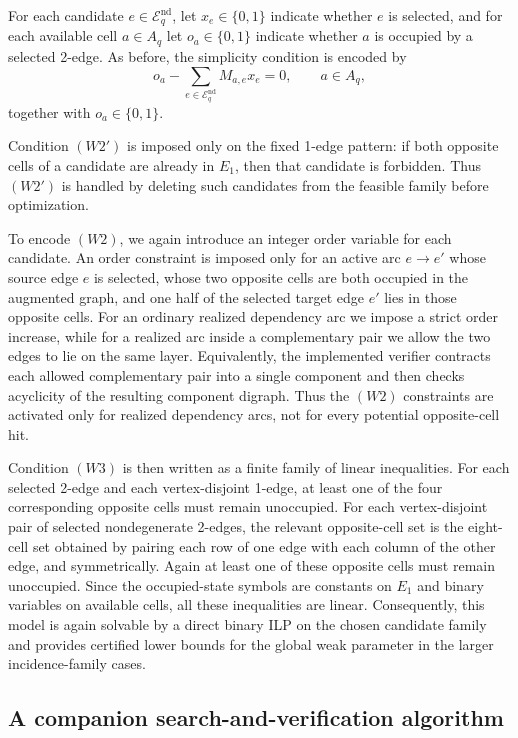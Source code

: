 \documentclass[10pt]{article}
\newcommand{\blue}[1]{#1}
\newcommand{\0}{\mathbf{0}}
\newcommand{\1}{\mathbf{1}}
\begin{document}
\blue{For each candidate \(e\in \mathcal E_q^{\mathrm{nd}}\), let \(x_e\in\{0,1\}\) indicate whether \(e\) is selected, and for each available cell \(a\in A_q\) let \(o_a\in\{0,1\}\) indicate whether \(a\) is occupied by a selected 2-edge. As before, the simplicity condition is encoded by}
\[
o_a-\sum_{e\in\mathcal E_q^{\mathrm{nd}}} M_{a,e}x_e=0,
\qquad a\in A_q,
\]
\blue{together with \(o_a\in\{0,1\}\).}

\blue{Condition \((W2')\) is imposed only on the fixed 1-edge pattern: if both opposite cells of a candidate are already in \(E_1\), then that candidate is forbidden. Thus \((W2')\) is handled by deleting such candidates from the feasible family before optimization.}

\blue{To encode \((W2)\), we again introduce an integer order variable for each candidate. An order constraint is imposed only for an active arc \(e\to e'\) whose source edge \(e\) is selected, whose two opposite cells are both occupied in the augmented graph, and one half of the selected target edge \(e'\) lies in those opposite cells. For an ordinary realized dependency arc we impose a strict order increase, while for a realized arc inside a complementary pair we allow the two edges to lie on the same layer. Equivalently, the implemented verifier contracts each allowed complementary pair into a single component and then checks acyclicity of the resulting component digraph. Thus the \((W2)\) constraints are activated only for realized dependency arcs, not for every potential opposite-cell hit.}

\blue{Condition \((W3)\) is then written as a finite family of linear inequalities. For each selected 2-edge and each vertex-disjoint 1-edge, at least one of the four corresponding opposite cells must remain unoccupied. For each vertex-disjoint pair of selected nondegenerate 2-edges, the relevant opposite-cell set is the eight-cell set obtained by pairing each row of one edge with each column of the other edge, and symmetrically. Again at least one of these opposite cells must remain unoccupied. Since the occupied-state symbols are constants on \(E_1\) and binary variables on available cells, all these inequalities are linear. Consequently, this model is again solvable by a direct binary ILP on the chosen candidate family and provides certified lower bounds for the global weak parameter in the larger incidence-family cases.}

\subsection*{A companion search-and-verification algorithm}
\end{document}

